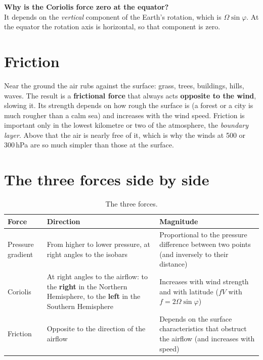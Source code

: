 \begin{askbox}
\textbf{Why is the Coriolis force zero at the equator?}\\
It depends on the \emph{vertical} component of the Earth's rotation, which is $\Omega\sin\varphi$. At the equator the rotation axis is horizontal, so that component is zero.
\end{askbox}

\section{Friction}

Near the ground the air rubs against the surface: grass, trees, buildings, hills, waves. The result is a \textbf{frictional force} that always acts \textbf{opposite to the wind}, slowing it. Its strength depends on how rough the surface is (a forest or a city is much rougher than a calm sea) and increases with the wind speed. Friction is important only in the lowest kilometre or two of the atmosphere, the \emph{boundary layer}. Above that the air is nearly free of it, which is why the winds at 500 or 300\,hPa are so much simpler than those at the surface.

\section{The three forces side by side}

\begin{table}[ht]
\centering
\caption{The three forces.}
\begin{tabularx}{\textwidth}{@{}lXX@{}}
\toprule
\textbf{Force} & \textbf{Direction} & \textbf{Magnitude}\\
\midrule
Pressure gradient & From higher to lower pressure, at right angles to the isobars & Proportional to the pressure difference between two points (and inversely to their distance)\\
Coriolis & At right angles to the airflow: to the \textbf{right} in the Northern Hemisphere, to the \textbf{left} in the Southern Hemisphere & Increases with wind strength and with latitude ($fV$ with $f=2\Omega\sin\varphi$)\\
Friction & Opposite to the direction of the airflow & Depends on the surface characteristics that obstruct the airflow (and increases with speed)\\
\bottomrule
\end{tabularx}
\end{table}

